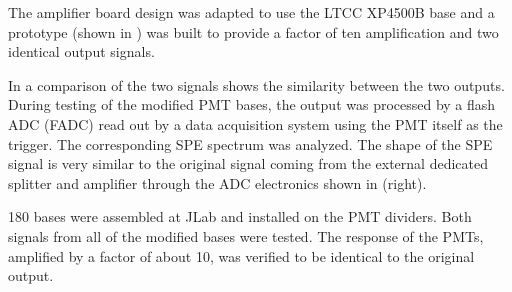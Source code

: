 The amplifier board design was adapted to use the LTCC XP4500B base and a prototype (shown in )
was built to provide a factor of ten amplification and two identical output signals.

In  a comparison of the two signals shows the similarity between the two outputs. During testing of
the modified PMT bases, the output was processed by a flash ADC (FADC) read out by a data acquisition system using
the PMT itself as the trigger. The corresponding SPE spectrum was analyzed. The shape of the SPE signal is very
similar to the original signal coming from the external dedicated splitter and amplifier through the ADC electronics
shown in  (right).

180 bases were assembled at JLab and installed on the PMT dividers. Both signals from all of the modified bases
were tested. The response of the PMTs, amplified by a factor of about 10, was verified to be identical to the original
output.

\vfil

